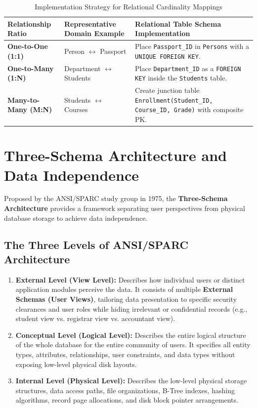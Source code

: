\begin{table}[htbp]
\centering
\caption{Implementation Strategy for Relational Cardinality Mappings}
\label{tab:relationship_implementation}
\begin{tabularx}{\textwidth}{l p{4.2cm} X}
\toprule
\textbf{Relationship Ratio} & \textbf{Representative Domain Example} & \textbf{Relational Table Schema Implementation} \\
\midrule
\textbf{One-to-One (1:1)} & Person $\longleftrightarrow$ Passport & Place \texttt{Passport\_ID} in \texttt{Persons} with a \texttt{UNIQUE FOREIGN KEY}. \\
\textbf{One-to-Many (1:N)} & Department $\longleftrightarrow$ Students & Place \texttt{Department\_ID} as a \texttt{FOREIGN KEY} inside the \texttt{Students} table. \\
\textbf{Many-to-Many (M:N)} & Students $\longleftrightarrow$ Courses & Create junction table \texttt{Enrollment(Student\_ID, Course\_ID, Grade)} with composite PK. \\
\bottomrule
\end{tabularx}
\end{table}

\newpage
\section{Three-Schema Architecture and Data Independence}

Proposed by the ANSI/SPARC study group in 1975, the \textbf{Three-Schema Architecture} provides a framework separating user perspectives from physical database storage to achieve data independence.

\subsection{The Three Levels of ANSI/SPARC Architecture}

\begin{enumerate}
\item \textbf{External Level (View Level):}
Describes how individual users or distinct application modules perceive the data. It consists of multiple \textbf{External Schemas (User Views)}, tailoring data presentation to specific security clearances and user roles while hiding irrelevant or confidential records (e.g., student view vs. registrar view vs. accountant view).
\item \textbf{Conceptual Level (Logical Level):}
Describes the entire logical structure of the whole database for the entire community of users. It specifies all entity types, attributes, relationships, user constraints, and data types without exposing low-level physical disk layouts.
\item \textbf{Internal Level (Physical Level):}
Describes the low-level physical storage structures, data access paths, file organizations, B-Tree indexes, hashing algorithms, record page allocations, and disk block pointer arrangements.
\end{enumerate}

